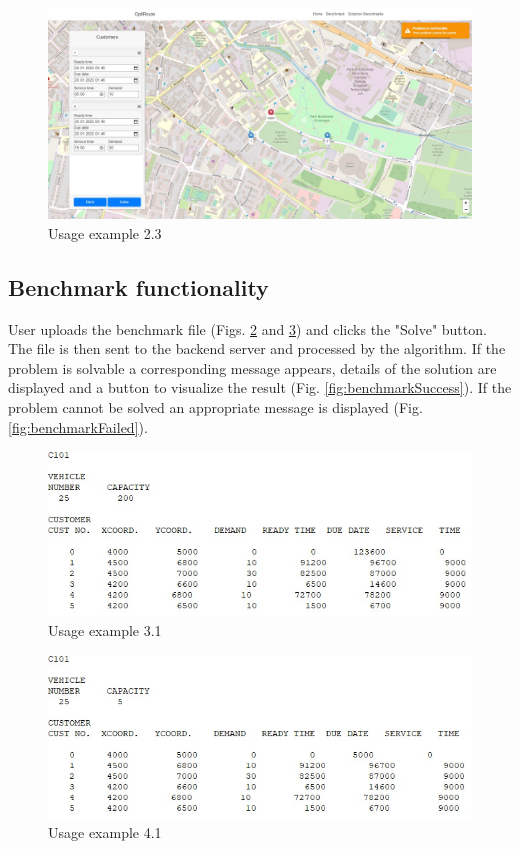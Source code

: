 \documentclass[a4paper,twoside,12pt]{book}
\begin{document}
\begin{figure}[H]
\centering
\includegraphics[width=\textwidth]{images/solutionFailed.jpg}
\caption{Usage example 2.3}
\label{fig:solutionFailed}
\end{figure}

\subsection{Benchmark functionality}
User uploads the benchmark file (Figs. \ref{fig:benchmarkFile1} and \ref{fig:benchmarkFile2}) and clicks the "Solve" button. The file is then sent to the backend server and processed by the algorithm. If the problem is solvable a corresponding message appears, details of the solution are displayed and a button to visualize the result (Fig. \ref{fig:benchmarkSuccess}). If the problem cannot be solved an appropriate message is displayed (Fig. \ref{fig:benchmarkFailed}).

\begin{figure}[H]
\centering
\includegraphics[scale=0.7]{images/benchmarkFile1.jpg}
\caption{Usage example 3.1}
\label{fig:benchmarkFile1}
\end{figure}

\begin{figure}[H]
\centering
\includegraphics[scale=0.7]{images/benchmarkFile2.jpg}
\caption{Usage example 4.1}
\label{fig:benchmarkFile2}
\end{figure}
\end{document}
